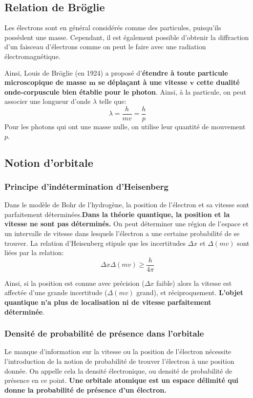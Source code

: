 \documentclass{article}
\begin{document}
\subsection{Relation de Bröglie}

Les électrons sont en général considérés comme des particules, puisqu'ils possèdent
une masse. Cependant, il est également possible d'obtenir la diffraction d'un faisceau
d'électrons comme on peut le faire avec une radiation électromagnétique. 

Ainsi, Louis de Bröglie (en 1924) a proposé d'\textbf{étendre à toute particule microscopique de masse $\bm{m}$ se déplaçant à une
vitesse $\bm{v}$ cette dualité onde-corpuscule bien établie pour le photon}.
Ainsi, à la particule, on peut associer une longueur d'onde $\lambda$ telle que:
$$\lambda=\frac{h}{mv}=\frac{h}{p}$$
Pour les photons qui ont une masse nulle, on utilise leur quantité de mouvement $p$.


\subsection{Notion d'orbitale}

\subsubsection{Principe d'indétermination d'Heisenberg}

Dans le modèle de Bohr de l'hydrogène, la position de l'électron et sa vitesse sont
parfaitement déterminées.\textbf{Dans la théorie quantique, la position et la vitesse
ne sont pas déterminés.}
On peut déterminer une région de l'espace et un intervalle de vitesse
dans lesquels l'électron a une certaine probabilité de se trouver.
La relation d'Heisenberg stipule que les incertitudes
$\Delta x$ et $\Delta (mv)$ sont liées par la relation:
$$\Delta x \Delta(mv) \ge \frac{h}{4\pi}$$

Ainsi, si la position est connue avec précision ($\Delta x$ faible) alors
la vitesse est affectée d'une grande incertitude ($\Delta (mv)$ grand), et réciproquement.
\textbf{L'objet quantique n'a plus de localisation ni de vitesse parfaitement déterminée}.


\subsubsection{Densité de probabilité de présence dans l'orbitale}

Le manque d'information sur la vitesse ou la position de l'électron nécessite
l'introduction de la notion de probabilité de trouver l'électron à une position donnée.
On appelle cela la densité électronique, ou densité de probabilité de présence en ce point.
\textbf{Une orbitale atomique est un espace délimité qui donne la probabilité de présence
d'un électron.}
\end{document}

